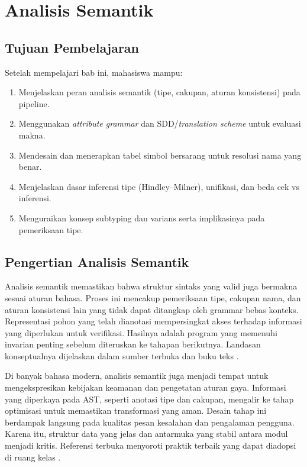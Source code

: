 \documentclass[../main.tex]{subfiles}
\begin{document}
\chapter{Analisis Semantik}

\section{Tujuan Pembelajaran}
Setelah mempelajari bab ini, mahasiswa mampu:
\begin{enumerate}[label=\alph*)]
  \item Menjelaskan peran analisis semantik (tipe, cakupan, aturan konsistensi) pada pipeline.
  \item Menggunakan \emph{attribute grammar} dan SDD/\emph{translation scheme} untuk evaluasi makna.
  \item Mendesain dan menerapkan tabel simbol bersarang untuk resolusi nama yang benar.
  \item Menjelaskan dasar inferensi tipe (Hindley--Milner), unifikasi, dan beda cek vs inferensi.
  \item Menguraikan konsep subtyping dan varians serta implikasinya pada pemeriksaan tipe.
\end{enumerate}

\section{Pengertian Analisis Semantik}
Analisis semantik memastikan bahwa struktur sintaks yang valid juga bermakna sesuai aturan bahasa. Proses ini mencakup pemeriksaan tipe, cakupan nama, dan aturan konsistensi lain yang tidak dapat ditangkap oleh grammar bebas konteks. Representasi pohon yang telah dianotasi mempersingkat akses terhadap informasi yang diperlukan untuk verifikasi. Hasilnya adalah program yang memenuhi invarian penting sebelum diteruskan ke tahapan berikutnya. Landasan konseptualnya dijelaskan dalam sumber terbuka dan buku teks \citep{Mogensen2010,Wirth1996}.

Di banyak bahasa modern, analisis semantik juga menjadi tempat untuk mengekspresikan kebijakan keamanan dan pengetatan aturan gaya. Informasi yang diperkaya pada AST, seperti anotasi tipe dan cakupan, mengalir ke tahap optimisasi untuk memastikan transformasi yang aman. Desain tahap ini berdampak langsung pada kualitas pesan kesalahan dan pengalaman pengguna. Karena itu, struktur data yang jelas dan antarmuka yang stabil antara modul menjadi kritis. Referensi terbuka menyoroti praktik terbaik yang dapat diadopsi di ruang kelas \citep{CS143}.
\end{document}
